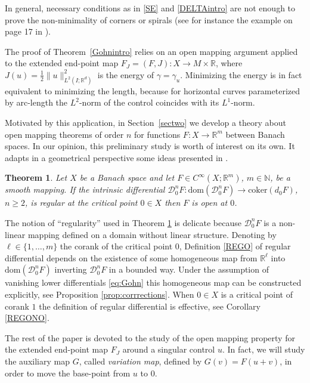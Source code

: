 \documentclass[12pt, reqno]{amsart}
\theoremstyle{plain}
\newtheorem {theorem}{Theorem}[section]
\theoremstyle{definition}
\theoremstyle{remark}
\numberwithin{equation}{section}
\newcommand{\R}{\mathbb{R}}
\newcommand{\N}{\mathbb{N}}
\newcommand{\0}{\theta}
\newcommand{\1}{{-1}}
\renewcommand{\=}{\coloneqq}
\renewcommand{\.}{\dots}
\newcommand{\mc}{\mathcal}
\newcommand{\coker}{\mathrm{coker}}
\newcommand{\dom}{\mathrm{dom}}
\begin{document}
 {\color{black} In general, necessary conditions as in \eqref{SE} and \eqref{DELTAintro} are not enough to prove the non-minimality of corners or spirals  (see for instance the example on page 17 in \cite{Joz21}).}
 
 
 
The proof of Theorem~\ref{Gohnintro} relies on an open mapping argument applied to the extended end-point map  $F_J =(F,J) : X\to M\times \R$, where $J(u) = \frac 12 \| u\|^2_{L^2(I;\R^d)}$ is the energy of $\gamma=\gamma_u$. Minimizing the energy is in fact equivalent to minimizing the length, because for horizontal curves parameterized by arc-length the $L^2$-norm of the control coincides with its $L^1$-norm.



Motivated by this application, in Section~\ref{sectwo}  we develop a  theory about open mapping theorems of order $n$ for functions $F:X\to \R^m$ between Banach spaces. In our opinion, this preliminary study is  worth of interest on its own. It adapts in a geometrical perspective some ideas presented in \cite{Sus03}. 



\begin{theorem}\label{thmopen}
 Let $X$ be a Banach space and let $ F\in C^\infty(X;\R^m)$, $m\in\N$,  be a smooth mapping. {\color{black}
 If  the  intrinsic differential $\mc D_0^n F:\dom(\mc D_0^n F)\to\coker(d_0F)$, $n\geq 2$, 
is regular at the critical point $0\in X$ then $F$ is open at $0$.}
\end{theorem}



{\color{black}
The notion of \enquote{regularity} used in Theorem \ref{thmopen} is delicate because   $\mc D_0^n F $ 
is a non-linear mapping defined on a domain without linear structure. Denoting by $\ell\in\{1,\ldots,m\} $ the corank of the critical point $0$, 
Definition 
\ref{REGO} of regular differential depends on 
the existence of some homogeneous map from $\R^\ell$ into $\dom(\mc D_0^n F)$ inverting $\mc D_0^n F$ in a bounded way.
Under the assumption of vanishing lower differentials  \eqref{eq:Gohn} this homogeneous map can be constructed  explicitly, see Proposition \ref{prop:corrrections}.
When $0\in X$ is a critical point of corank $1$ the definition of regular differential is effective, see Corollary \ref{REGONO}.
}



The rest of the paper is devoted to the study of the open mapping property for the extended end-point map $F_J$ around a singular control $u$. 
In fact, we will study the auxiliary map $G$, called  \emph{variation map}, 
defined by $G(v) = F(u+v)$,
in order to move the base-point from $u$ to $0$.
\end{document}
